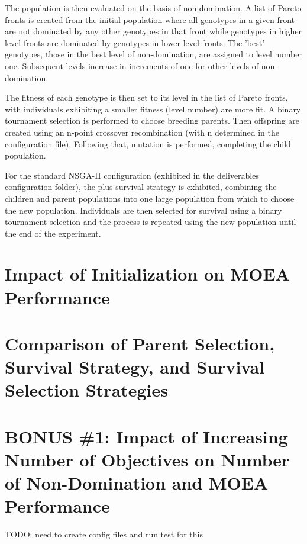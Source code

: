 \documentclass[11pt]{article}
\newcommand{\fitnessplotcaption}[1]{\caption{Evaluations versus Average Local Fitness and Evaluations versus 
    Local Best Fitness for the \textbf{{#1}}, Averaged Over All Runs}}
\newcommand{\addgraphic}[1]{\centerline{\texttt{[image: report/figures/\{\#1]}.png}}}
\begin{document}
The population is then evaluated on the basis of non-domination. A list of Pareto fronts is created
from the initial population where all genotypes in a given front are not dominated
by any other genotypes in that front while genotypes in higher level fronts are dominated
by genotypes in lower level fronts. The 'best' genotypes, those in the best level
of non-domination, are assigned to level number one. Subsequent levels increase in
increments of one for other levels of non-domination.

The fitness of each genotype is then set to its level in the list of Pareto fronts, with
individuals exhibiting a smaller fitness (level number) are more fit. A binary tournament selection 
is performed to choose breeding parents. Then offspring are created using an n-point crossover
recombination (with n determined in the configuration file). Following that, mutation is performed,
completing the child population.

For the standard NSGA-II configuration (exhibited in the deliverables configuration folder),
the plus survival strategy is exhibited, combining the children and parent populations into 
one large population from which to choose the new population. Individuals are then selected for 
survival using a binary tournament selection and the process is repeated using the new population
until the end of the experiment.


\section{Impact of Initialization on MOEA Performance}


\section{Comparison of Parent Selection, Survival Strategy, and Survival Selection Strategies}


\section{BONUS \#1: Impact of Increasing Number of Objectives on Number of Non-Domination and MOEA Performance}

TODO: need to create config files and run test for this

\end{document}

